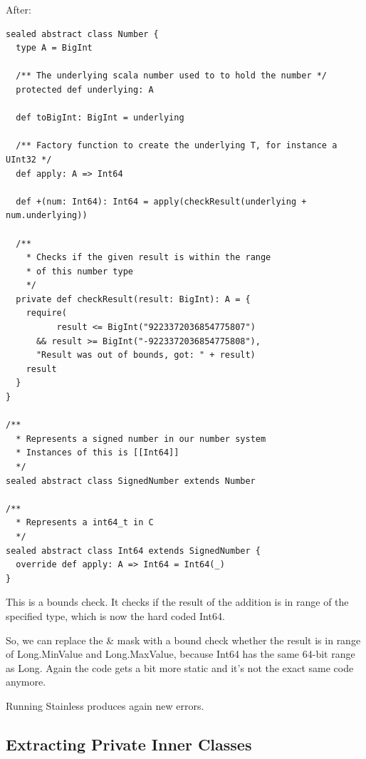 \documentclass[runningheads]{llncs}
\begin{document}
After:
\begin{lstlisting}[style=scala]
sealed abstract class Number {
  type A = BigInt

  /** The underlying scala number used to to hold the number */
  protected def underlying: A

  def toBigInt: BigInt = underlying

  /** Factory function to create the underlying T, for instance a UInt32 */
  def apply: A => Int64

  def +(num: Int64): Int64 = apply(checkResult(underlying + num.underlying))

  /**
    * Checks if the given result is within the range
    * of this number type
    */
  private def checkResult(result: BigInt): A = {
    require(
          result <= BigInt("9223372036854775807")
      && result >= BigInt("-9223372036854775808"),
      "Result was out of bounds, got: " + result)
    result
  }
}

/**
  * Represents a signed number in our number system
  * Instances of this is [[Int64]]
  */
sealed abstract class SignedNumber extends Number

/**
  * Represents a int64_t in C
  */
sealed abstract class Int64 extends SignedNumber {
  override def apply: A => Int64 = Int64(_)
}
\end{lstlisting}

This is a bounds check.
It checks if the result of the addition is in range of the specified type, which is now the hard coded Int64.

So, we can replace the \& mask with a bound check whether the result is in range of Long.MinValue and Long.MaxValue, because Int64 has the same 64-bit range as Long.
Again the code gets a bit more static and it's not the exact same code anymore.

Running Stainless produces again new errors.


\subsection{Extracting Private Inner Classes}
\end{document}
